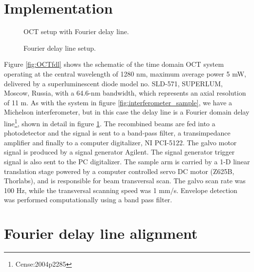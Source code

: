 \documentclass[12pt,twoside,english]{book}
\renewcommand{\~}{\perispomeni}%
\DeclareRobustCommand{\textgreek}[1]{\leavevmode{\greektext #1}}
\numberwithin{equation}{section}
\numberwithin{figure}{section}
\begin{document}
\section{Implementation}

\begin{figure}
\begin{minipage}[t]{0.48\textwidth}

\caption{OCT setup with Fourier delay line.}
\label{fig:OCTfdl}
\end{minipage}
\hfill
\begin{minipage}[t]{0.48\textwidth}

\caption{Fourier delay line setup.}
\label{fig:FDL setup}
\end{minipage}
\end{figure}


Figure \ref{fig:OCTfdl} shows the schematic of the time domain OCT system operating at the central wavelength of 1280 nm, maximum average power 5 mW, delivered by a superluminescent diode model no. SLD-571, SUPERLUM, Moscow, Russia, with a 64.6-nm bandwidth, which represents an axial resolution of 11 \textgreek{m}m. As with the system in figure \ref{fig:interferometer_sample}, we have a Michelson interferometer, but in this case the delay line is a Fourier domain delay line\footnote{Cense:2004p2285}, shown in detail in figure \ref{fig:FDL setup}. The recombined beams are fed into a photodetector and the signal is sent to a band-pass filter, a transimpedance amplifier and finally to a computer digitalizer, NI PCI-5122. The galvo motor signal is produced by a signal generator Agilent. The signal generator trigger signal is also sent to the PC digitalizer. The sample arm is carried by a 1-D linear translation stage powered by a computer controlled servo DC motor (Z625B, Thorlabs), and is responsible for beam transversal scan. The galvo scan rate was 100 Hz, while the transversal scanning speed was 1 mm/s. Envelope detection was performed computationally using a band pass filter.

\section{Fourier delay line alignment}
\end{document}
